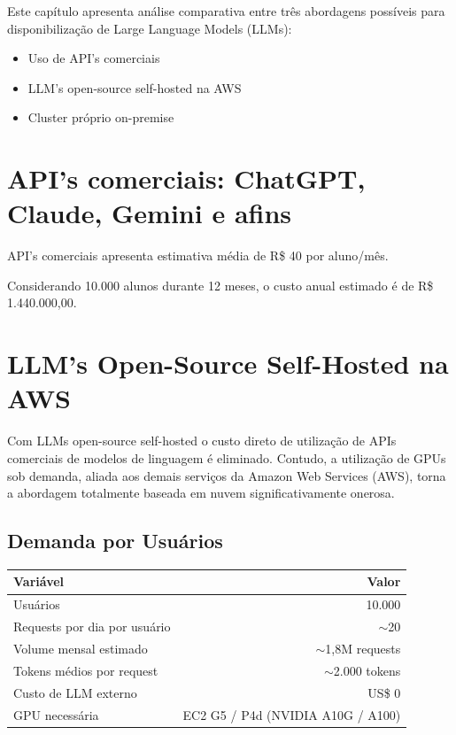 \documentclass[12pt,a4paper,]{abntex2}
\begin{document}
Este capítulo apresenta análise comparativa entre três abordagens possíveis para disponibilização de Large Language Models (LLMs):

\begin{itemize}
\item Uso de API's comerciais
\item LLM's open-source self-hosted na AWS
\item Cluster próprio on-premise
\end{itemize}

\section{API's comerciais: ChatGPT, Claude, Gemini e afins}
API's comerciais apresenta estimativa média de R\$ 40 por aluno/mês.

Considerando 10.000 alunos durante 12 meses, o custo anual estimado é de R\$ 1.440.000,00.

\section{LLM's Open-Source Self-Hosted na AWS}

Com LLMs open-source self-hosted o custo direto de utilização de APIs comerciais de modelos de linguagem é eliminado. Contudo, a utilização de GPUs sob demanda, aliada aos demais serviços da Amazon Web Services (AWS), torna a abordagem totalmente baseada em nuvem significativamente onerosa.

\subsection{Demanda por Usuários}

\begin{table}[h]
\centering
\begin{tabular}{|l|r|}
\hline
\textbf{Variável} & \textbf{Valor} \\
\hline
Usuários & 10.000 \\
Requests por dia por usuário & $\sim$20 \\
Volume mensal estimado & $\sim$1,8M requests \\
Tokens médios por request & $\sim$2.000 tokens \\
Custo de LLM externo & US\$ 0 \\
GPU necessária & EC2 G5 / P4d (NVIDIA A10G / A100) \\
\hline
\end{tabular}
\end{table}
\newpage
\end{document}
